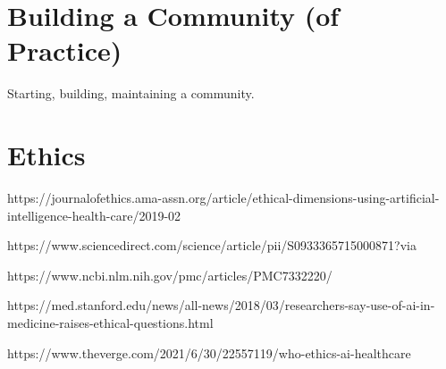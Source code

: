 \documentclass[../main.tex]{subfiles}
\begin{document}
        

    \section{Building a Community (of Practice)}



        Starting, building, maintaining a community.

    \section{Ethics}


    \cite{Chen2020}


    \cite{ostblomOpinionatedPracticesTeaching2021}

    https://journalofethics.ama-assn.org/article/ethical-dimensions-using-artificial-intelligence-health-care/2019-02

    https://www.sciencedirect.com/science/article/pii/S0933365715000871?via%

    https://www.ncbi.nlm.nih.gov/pmc/articles/PMC7332220/

    https://med.stanford.edu/news/all-news/2018/03/researchers-say-use-of-ai-in-medicine-raises-ethical-questions.html

    https://www.theverge.com/2021/6/30/22557119/who-ethics-ai-healthcare
\end{document}
